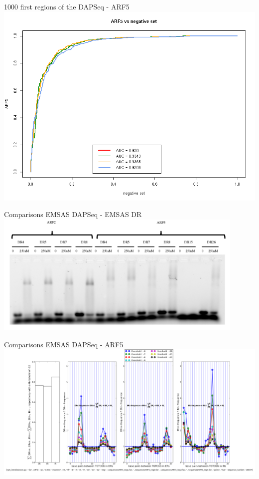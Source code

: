 \documentclass{beamer}
\begin{document}
\begin{frame}{1000 first regions of the DAPSeq - ARF5}
  \includegraphics[width=1\textwidth,height=0.8\textheight,center]{ROC_ARF5_negative_set.png}
\end{frame}

\begin{frame}{Comparisons EMSAS DAPSeq - EMSAS DR}
  \includegraphics[width=0.9\textwidth,height=0.8\textheight,center]{EMSA_DR.png}
\end{frame}


\begin{frame}{Comparisons EMSAS DAPSeq - ARF5}
  \includegraphics[width=1\textwidth,height=0.8\textheight,center]{ARF5_interdistances_-6-7-8-9-10-11-12_points_4Neg.png}
\end{frame}
\end{document}
